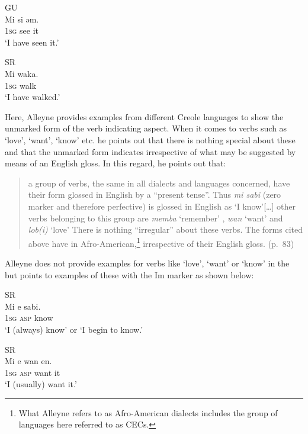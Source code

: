 \ex
GU\\
\gll Mi si ǝm.\\
\textsc{1sg} see it \\
\glt `I have seen it.'

\ex SR\\
\gll  Mi waka.\\
\textsc{1sg} walk     \\
\glt `I have walked.' 
\z \z

Here, Alleyne provides examples from different Creole languages to
show the unmarked form of the verb indicating  aspect.  When
it comes to verbs such as `love', `want', `know' etc. he points out
that there is nothing special about these and that the unmarked form
indicates  irrespective of what may be suggested by means of
an English gloss.  In this regard, he points out that:

\begin{quote}
a group of verbs, the same in all dialects and languages concerned,
have their  form glossed in English by a ``present
tense”. Thus \textit{mi sabi} (zero marker and therefore perfective)
is glossed in English as `I know'[…] other verbs belonging to this
group are \textit{memba} `remember' , \textit{wan} `want' and
\textit{lob(i)} `love' There is nothing “irregular” about these
verbs. The forms cited above have  in
Afro-American,\footnote{What Alleyne refers to as Afro-American
  dialects includes the group of languages here referred to as CECs.}
irrespective of their English gloss. (p.~83)
\end{quote}

Alleyne does not provide examples for verbs like `love', `want' or
`know' in the  but points to examples of these with the
Im marker as shown below:

\ea\label{ex:2:3} \citep[83]{Alleyne1980}
\ea SR\\

\gll Mi e sabi.\\
		\textsc{1sg} \textsc{asp} know\\
\glt `I (always) know' or `I begin to know.'

\ex SR\\
\gll Mi e wan en.\\
	\textsc{1sg} \textsc{asp} want it                \\
\glt `I (usually) want it.'

